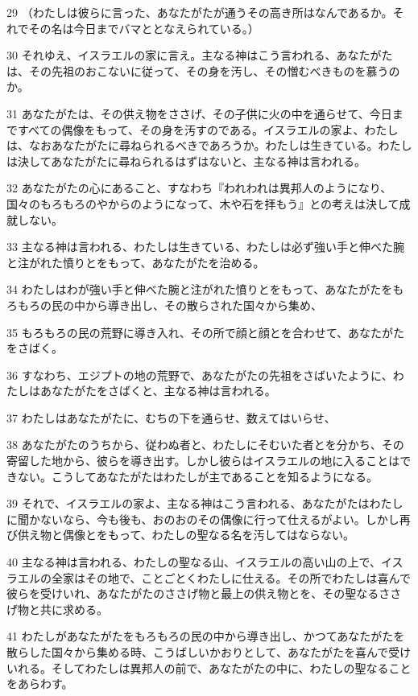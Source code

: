 \par 29 （わたしは彼らに言った、あなたがたが通うその高き所はなんであるか。それでその名は今日までバマととなえられている。）
\par 30 それゆえ、イスラエルの家に言え。主なる神はこう言われる、あなたがたは、その先祖のおこないに従って、その身を汚し、その憎むべきものを慕うのか。
\par 31 あなたがたは、その供え物をささげ、その子供に火の中を通らせて、今日まですべての偶像をもって、その身を汚すのである。イスラエルの家よ、わたしは、なおあなたがたに尋ねられるべきであろうか。わたしは生きている。わたしは決してあなたがたに尋ねられるはずはないと、主なる神は言われる。
\par 32 あなたがたの心にあること、すなわち『われわれは異邦人のようになり、国々のもろもろのやからのようになって、木や石を拝もう』との考えは決して成就しない。
\par 33 主なる神は言われる、わたしは生きている、わたしは必ず強い手と伸べた腕と注がれた憤りとをもって、あなたがたを治める。
\par 34 わたしはわが強い手と伸べた腕と注がれた憤りとをもって、あなたがたをもろもろの民の中から導き出し、その散らされた国々から集め、
\par 35 もろもろの民の荒野に導き入れ、その所で顔と顔とを合わせて、あなたがたをさばく。
\par 36 すなわち、エジプトの地の荒野で、あなたがたの先祖をさばいたように、わたしはあなたがたをさばくと、主なる神は言われる。
\par 37 わたしはあなたがたに、むちの下を通らせ、数えてはいらせ、
\par 38 あなたがたのうちから、従わぬ者と、わたしにそむいた者とを分かち、その寄留した地から、彼らを導き出す。しかし彼らはイスラエルの地に入ることはできない。こうしてあなたがたはわたしが主であることを知るようになる。
\par 39 それで、イスラエルの家よ、主なる神はこう言われる、あなたがたはわたしに聞かないなら、今も後も、おのおのその偶像に行って仕えるがよい。しかし再び供え物と偶像とをもって、わたしの聖なる名を汚してはならない。
\par 40 主なる神は言われる、わたしの聖なる山、イスラエルの高い山の上で、イスラエルの全家はその地で、ことごとくわたしに仕える。その所でわたしは喜んで彼らを受けいれ、あなたがたのささげ物と最上の供え物とを、その聖なるささげ物と共に求める。
\par 41 わたしがあなたがたをもろもろの民の中から導き出し、かつてあなたがたを散らした国々から集める時、こうばしいかおりとして、あなたがたを喜んで受けいれる。そしてわたしは異邦人の前で、あなたがたの中に、わたしの聖なることをあらわす。
